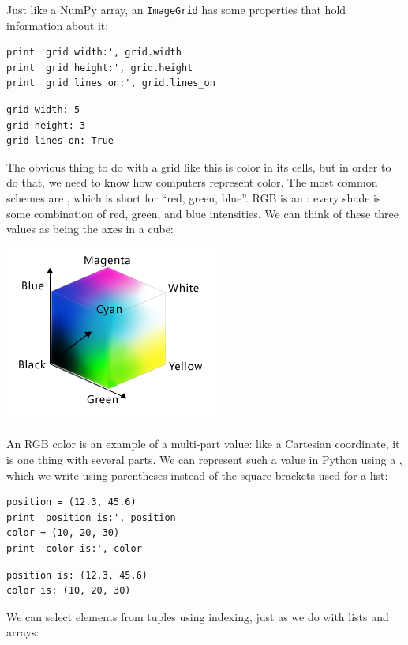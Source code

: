 \documentclass{book}
\begin{document}
Just like a NumPy array, an \texttt{ImageGrid} has some properties that
hold information about it:

\begin{verbatim}
print 'grid width:', grid.width
print 'grid height:', grid.height
print 'grid lines on:', grid.lines_on
\end{verbatim}

\begin{verbatim}
grid width: 5
grid height: 3
grid lines on: True
\end{verbatim}

The obvious thing to do with a grid like this is color in its cells, but
in order to do that, we need to know how computers represent color. The
most common schemes are , which is short for ``red,
green, blue''. RGB is an : every shade is some combination of red, green, and blue
intensities. We can think of these three values as being the axes in a
cube:

\includegraphics{novice/python/img/color-cube.png}

An RGB color is an example of a multi-part value: like a Cartesian
coordinate, it is one thing with several parts. We can represent such a
value in Python using a , which we write using
parentheses instead of the square brackets used for a list:

\begin{verbatim}
position = (12.3, 45.6)
print 'position is:', position
color = (10, 20, 30)
print 'color is:', color
\end{verbatim}

\begin{verbatim}
position is: (12.3, 45.6)
color is: (10, 20, 30)
\end{verbatim}

We can select elements from tuples using indexing, just as we do with
lists and arrays:
\end{document}
